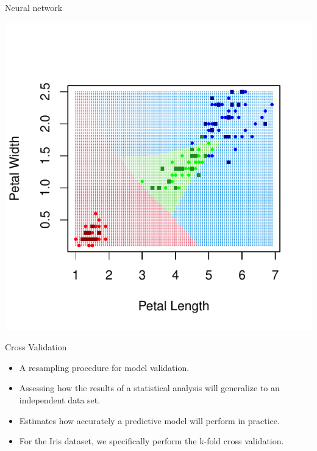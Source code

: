 \documentclass[aspectratio=1610, t]{beamer}\usepackage[]{graphicx}\usepackage[]{color}
\makeatletter
\def\maxwidth{ %
  \ifdim\Gin@nat@width>\linewidth
    \linewidth
  \else
    \Gin@nat@width
  \fi
}
\newenvironment{knitrout}{}{} %
\makeatother
\begin{document}
\begin{frame}{Neural network}

\vspace{-2cm}


\begin{knitrout}
\color{fgcolor}

{\centering \includegraphics[width=\maxwidth]{figure/nnw1-1} 

}


\end{knitrout}

\end{frame}


        




\begin{frame}[t]{Cross Validation}

\begin{itemize}
  \item A resampling procedure for model validation.
  \item Assessing how the results of a statistical analysis will generalize to an independent data set.
  \item Estimates how accurately a predictive model will perform in practice.
  \item For the Iris dataset, we specifically perform the k-fold cross validation.
  
\end{itemize}
        
\end{frame}
\end{document}
